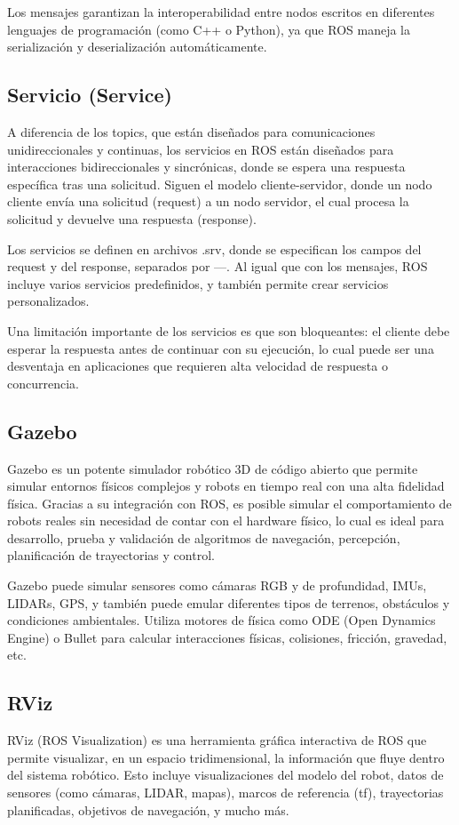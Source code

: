 Los mensajes garantizan la interoperabilidad entre nodos escritos en diferentes lenguajes de programación (como C++ o Python), ya que ROS maneja la serialización y deserialización automáticamente.

\subsection{Servicio (Service)}
A diferencia de los topics, que están diseñados para comunicaciones unidireccionales y continuas, los servicios en ROS están diseñados para interacciones bidireccionales y sincrónicas, donde se espera una respuesta específica tras una solicitud. Siguen el modelo cliente-servidor, donde un nodo cliente envía una solicitud (request) a un nodo servidor, el cual procesa la solicitud y devuelve una respuesta (response).

Los servicios se definen en archivos .srv, donde se especifican los campos del request y del response, separados por ---. Al igual que con los mensajes, ROS incluye varios servicios predefinidos, y también permite crear servicios personalizados.

Una limitación importante de los servicios es que son bloqueantes: el cliente debe esperar la respuesta antes de continuar con su ejecución, lo cual puede ser una desventaja en aplicaciones que requieren alta velocidad de respuesta o concurrencia.

\subsection{Gazebo}
Gazebo es un potente simulador robótico 3D de código abierto que permite simular entornos físicos complejos y robots en tiempo real con una alta fidelidad física. Gracias a su integración con ROS, es posible simular el comportamiento de robots reales sin necesidad de contar con el hardware físico, lo cual es ideal para desarrollo, prueba y validación de algoritmos de navegación, percepción, planificación de trayectorias y control.

Gazebo puede simular sensores como cámaras RGB y de profundidad, IMUs, LIDARs, GPS, y también puede emular diferentes tipos de terrenos, obstáculos y condiciones ambientales. Utiliza motores de física como ODE (Open Dynamics Engine) o Bullet para calcular interacciones físicas, colisiones, fricción, gravedad, etc.

\subsection{RViz}
RViz (ROS Visualization) es una herramienta gráfica interactiva de ROS que permite visualizar, en un espacio tridimensional, la información que fluye dentro del sistema robótico. Esto incluye visualizaciones del modelo del robot, datos de sensores (como cámaras, LIDAR, mapas), marcos de referencia (tf), trayectorias planificadas, objetivos de navegación, y mucho más.

